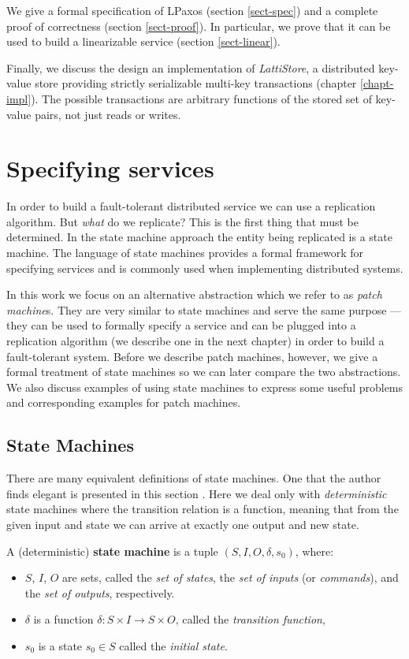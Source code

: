 \documentclass[12pt,a4paper,en]{pracamgr}
\newcommand{\tb}[1]{\textbf{#1}}
\newcommand{\ti}[1]{\textit{#1}}
\begin{document}
We give a formal specification of LPaxos (section \ref{sect-spec}) and a complete proof of correctness (section \ref{sect-proof}). In particular, we prove that it can be used to build a linearizable service (section \ref{sect-linear}).

Finally, we discuss the design an implementation of \ti{LattiStore}, a distributed key-value store providing strictly serializable \cite{h&w} multi-key transactions (chapter \ref{chapt-impl}). The possible transactions are arbitrary functions of the stored set of key-value pairs, not just reads or writes.

\chapter{Specifying services}

In order to build a fault-tolerant distributed service we can use a replication algorithm. But \ti{what} do we replicate? This is the first thing that must be determined. In the state machine approach the entity being replicated is a state machine. The language of state machines provides a formal framework for specifying services and is commonly used when implementing distributed systems.

In this work we focus on an alternative abstraction which we refer to as \ti{patch machine}s. They are very similar to state machines and serve the same purpose --- they can be used to formally specify a service and can be plugged into a replication algorithm (we describe one in the next chapter) in order to build a fault-tolerant system. Before we describe patch machines, however, we give a formal treatment of state machines so we can later compare the two abstractions. We also discuss examples of using state machines to express some useful problems and corresponding examples for patch machines.

\section{State Machines}\label{sect-sms}

There are many equivalent definitions of state machines. One that the author finds elegant is presented in this section \cite{lamport-reliable}. Here we deal only with \ti{deterministic} state machines where the transition relation is a function, meaning that from the given input and state we can arrive at exactly one output and new state.

\begin{defin}

	A (deterministic) \tb{state machine} is a tuple $(S, I, O, \delta, s_0)$, where:
	\begin{itemize}
		\item $S$, $I$, $O$ are sets, called the \ti{set of states}, the \ti{set of inputs} (or \ti{commands}), and the \ti{set of outputs}, respectively.
		\item $\delta$ is a function $\delta: S \times I \rightarrow S \times O$, called the \ti{transition function},
		\item $s_0$ is a state $s_0 \in S$ called the \ti{initial state}.
	\end{itemize}
\end{defin}
\end{document}
